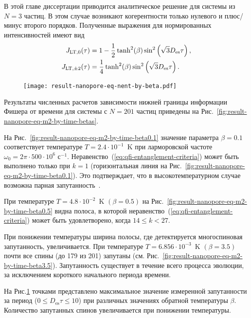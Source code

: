 В этой главе диссертации приводится аналитическое решение для системы из $N=3$ частиц.
В этом случае возникают когерентности только нулевого и плюс/минус второго порядков.
Полученные выражения для нормированных интенсивностей имеют вид
%
\begin{align}\label{eq:j_lt_3}
  J_{\mathrm{LT}, 0}(\tau) & = 1 - \frac 1 2 \tanh^2(\beta)\sin^2\left( \sqrt 3 D_\mathrm{es} \tau \right), \\
  J_{\mathrm{LT},\pm 2}(\tau) & = \frac 1 4 \tanh^2(\beta)\sin^2\left( \sqrt 3 D_\mathrm{es} \tau \right).
\end{align}

\begin{figure}
  \texttt{[image: result-nanopore-eq-nent-by-beta.pdf]}
  \caption{\protect}
  \label{fig:result-nanopore-eq-nent-by-beta}
\end{figure}

Результаты численных расчетов зависимости нижней границы информации Фишера от времени для системы с $N=201$ частиц приведены на Рис.~\ref{fig:result-nanopore-eq-m2-by-time-betas}.

На Рис.~\ref{fig:result-nanopore-eq-m2-by-time-beta0.1} значение параметра $\beta = 0.1$ соответствует температуре ${T= 2.4\cdot 10^{-1}}$~K при ларморовской частоте $\omega_0 = 2\pi\cdot 500\cdot10^6$ с$^{-1}$.
Неравенство~(\ref{eq:qfi-entanglement-criteria}) может быть выполнено только при $k=1$ (горизонтальная линия на Рис.~\ref{fig:result-nanopore-eq-m2-by-time-beta0.1}).
Это подтверждает, что в высокотемпературном случае возможна парная запутанность~\cite{Feldman2012}.

При температуре $T = {4.8\cdot10^{-2}}$~K $(\beta=0.5)$ на Рис.~\ref{fig:result-nanopore-eq-m2-by-time-beta0.5} видна полоса, в которой неравенство~(\ref{eq:qfi-entanglement-criteria}) может быть удовлетворено, когда $14 \leq k < 27$.

При понижении температуры ширина полосы, где детектируется многоспиновая запутанность, увеличивается.
При температуре $T= 6.856\cdot10^{-3}$~K $(\beta=3.5)$
почти все спины (до 179 из 201) запутаны (см. Рис.~\ref{fig:result-nanopore-eq-m2-by-time-beta3.5}).
Запутанность существует в течение всего процесса эволюции, за исключением короткого начального периода времени.

На Рис.\ref{fig:result-nanopore-eq-nent-by-beta} точками представлено максимальное значение измеренной запутанности за период ($0 \leq D_\mathrm{es}\tau \leq 10$) при различных значениях обратной температуры $\beta$.
Количество запутанных спинов увеличивается при понижении температуры.

